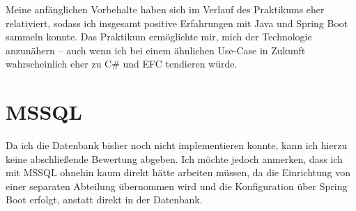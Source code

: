 Meine anfänglichen Vorbehalte haben sich im Verlauf des Praktikums eher relativiert, sodass ich insgesamt positive Erfahrungen mit Java und Spring Boot sammeln konnte. 
Das Praktikum ermöglichte mir, mich der Technologie anzunähern – auch wenn ich bei einem ähnlichen Use-Case in Zukunft wahrscheinlich eher zu C\# und EFC tendieren würde.
\section{MSSQL}
Da ich die Datenbank bisher noch nicht implementieren konnte, kann ich hierzu keine abschließende Bewertung abgeben.
Ich möchte jedoch anmerken, dass ich mit MSSQL ohnehin kaum direkt hätte arbeiten müssen, 
da die Einrichtung von einer separaten Abteilung übernommen wird und die Konfiguration über Spring Boot erfolgt, anstatt direkt in der Datenbank.